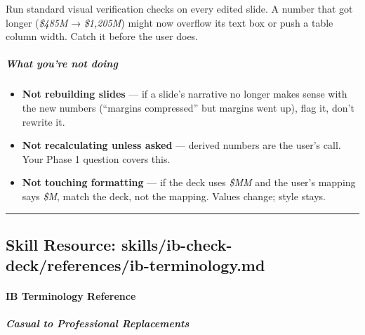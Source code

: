 \documentclass[11pt]{article}
\begin{document}
Run standard visual verification checks on every edited slide. A number that got longer (\emph{\$485M} → \emph{\$1,205M}) might now overflow its text box or push a table column width. Catch it before the user does.


\subparagraph{What you're not doing}\mbox{}\par

\begin{itemize}[leftmargin=*,itemsep=2pt,topsep=2pt]
\item {} \textbf{Not rebuilding slides} — if a slide's narrative no longer makes sense with the new numbers (``margins compressed'' but margins went up), flag it, don't rewrite it.
\item {} \textbf{Not recalculating unless asked} — derived numbers are the user's call. Your Phase 1 question covers this.
\item {} \textbf{Not touching formatting} — if the deck uses \emph{\$MM} and the user's mapping says \emph{\$M}, match the deck, not the mapping. Values change; style stays.
\end{itemize}

\vspace{0.8em}\hrule\vspace{0.8em}

\subsection{Skill Resource: skills/ib-check-deck/references/ib-terminology.md}\label{file:skills-ib-check-deck-references-ib-terminology-md}

\paragraph{IB Terminology Reference}\mbox{}\par

\subparagraph{Casual to Professional Replacements}\mbox{}\par
\end{document}
